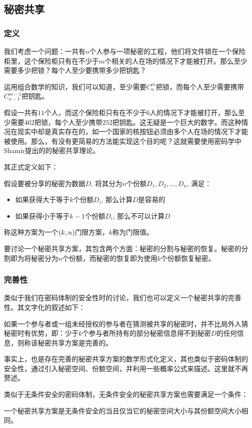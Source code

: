 \subsection{秘密共享}
\subsubsection{定义}
我们考虑一个问题：一共有$n$个人参与一项秘密的工程，他们将文件锁在一个保险柜里，这个保险柜只有在不少于$m$个相关的人在场的情况下才能被打开。那么至少需要多少把锁？每个人至少要携带多少把钥匙？\par
运用组合数学的知识，我们可以知道，至少需要$C_n^m$把锁，而每个人至少需要携带$C_{n-1}^{m-1}$把钥匙。\par
假设一共有$11$个人，而这个保险柜只有在不少于$6$人的情况下才能被打开，那么至少需要$462$把锁，每个人至少携带$252$把钥匙。这无疑是一个巨大的数字。而这种情况在现实中却是真实存在的，如一个国家的核按钮必须由多个人在场的情况下才能被使用。那么，有没有更简易的方法能实现这个目的呢？这就需要使用密码学中Shamir提出的的秘密共享理论。\par
其正式定义如下：\par
假设要被分享的秘密为数据$D$, 将其分为$n$个份额$D_1, D_2,\ldots, D_n$, 满足：
\begin{itemize}
	\item 如果获得大于等于$k$个份额$D_i$, 那么计算$D$是容易的
	\item 如果获得小于等于$k-1$个份额$D_i$, 那么不可以计算$D$
\end{itemize}

称这种方案为一个$\left( {k, n}\right)$门限方案，$k$称为门限值。\par
要讨论一个秘密共享方案，其包含两个方面：秘密的分割与秘密的恢复。秘密的分割即为将秘密分为$n$个份额，而秘密的恢复即为使用$k$个份额恢复秘密。
\subsubsection{完善性}
类似于我们在密码体制的安全性时的讨论，我们也可以定义一个秘密共享的完善性。其文字化的叙述如下：
\begin{Definition}
如果一个参与者或一组未经授权的参与者在猜测被共享的秘密时，并不比局外人猜秘密时有优势，即：少于$k$个参与者所持有的部分秘密信息得不到秘密$D$的任何信息，则称该秘密共享方案是完善的。
\end{Definition}

事实上，也是存在完善的秘密共享方案的数学形式化定义，其也类似于密码体制的安全性，通过引入秘密空间、份额空间，并利用一些概率公式来描述。这里就不再赘述。\par
类似于无条件安全的密码体制，无条件安全的秘密共享方案也需要满足一个条件：
\begin{theorem}
一个秘密共享方案是无条件安全的当且仅当它的秘密空间大小与其份额空间大小相同。
\end{theorem}

